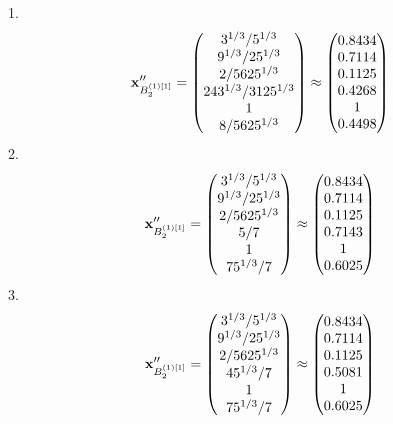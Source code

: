 \documentclass[10pt,a4paper]{article}
\begin{document}
	1.
	\[
		\bold{x}''_{B_2^{(1)[1]}} = 
		\begin{pmatrix}
			{{3^ {1 / 3}}} / {{5^ {1 / 3}}} \\
			{{9^ {1 / 3}}} / {{25^ {1 / 3}}} \\
			{{2}} / {{5625^ {1 / 3}}} \\
			{{243^ {1 / 3}}} / {{3125^ {1 / 3}}} \\
			{1}{} \\
			{{8}} / {{5625^ {1 / 3}}} \\
		\end{pmatrix}
		\approx
		\begin{pmatrix}
			0.8434   \\
			0.7114   \\
			0.1125   \\
			0.4268   \\
			1        \\
			0.4498   \\
		\end{pmatrix}
	\]
	2.
	\[
		\bold{x}''_{B_2^{(1)[1]}} = 
		\begin{pmatrix}
			{{3^ {1 / 3}}} / {{5^ {1 / 3}}} \\
			{{9^ {1 / 3}}} / {{25^ {1 / 3}}} \\
			{{2}} / {{5625^ {1 / 3}}} \\
			{{5}} / {{7}} \\
			{1}{} \\
			{{75^ {1 / 3}}} / {{7}} \\
		\end{pmatrix}
		\approx
		\begin{pmatrix}
			0.8434   \\
			0.7114   \\
			0.1125   \\
			0.7143   \\
			1        \\
			0.6025   \\
		\end{pmatrix}
	\]
	3.
	\[
		\bold{x}''_{B_2^{(1)[1]}} = 
		\begin{pmatrix}
			{{3^ {1 / 3}}} / {{5^ {1 / 3}}} \\
			{{9^ {1 / 3}}} / {{25^ {1 / 3}}} \\
			{{2}} / {{5625^ {1 / 3}}} \\
			{{45^ {1 / 3}}} / {{7}} \\
			{1}{} \\
			{{75^ {1 / 3}}} / {{7}} \\
		\end{pmatrix}
		\approx
		\begin{pmatrix}
			0.8434   \\
			0.7114   \\
			0.1125   \\
			0.5081   \\
			1        \\
			0.6025   \\
		\end{pmatrix}
	\]
\end{document}
